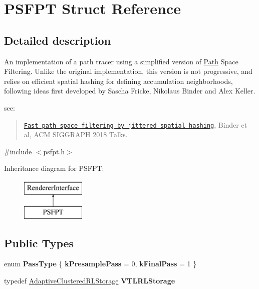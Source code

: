 \hypertarget{struct_p_s_f_p_t}{}\section{P\+S\+F\+PT Struct Reference}
\label{struct_p_s_f_p_t}


\subsection{Detailed description}
An implementation of a path tracer using a simplified version of \hyperlink{struct_path}{Path} Space Filtering. Unlike the original implementation, this version is not progressive, and relies on efficient spatial hashing for defining accumulation neighborhoods, following ideas first developed by Sascha Fricke, Nikolaus Binder and Alex Keller.

see\+: \begin{quote}
\href{https://dl.acm.org/citation.cfm?id=3214806}{\tt Fast path space filtering by jittered spatial hashing}, Binder et al, A\+CM S\+I\+G\+G\+R\+A\+PH 2018 Talks.\end{quote}


{\ttfamily \#include $<$psfpt.\+h$>$}

Inheritance diagram for P\+S\+F\+PT\+:\begin{figure}[H]
\begin{center}
\leavevmode
\includegraphics[height=2.000000cm]{struct_p_s_f_p_t}
\end{center}
\end{figure}
\subsection*{Public Types}
\begin{DoxyCompactItemize}
\item 
\mbox{\label{struct_p_s_f_p_t_af3457e65a23c54ff498f309b7e734480}} 
enum {\bfseries Pass\+Type} \{ {\bfseries k\+Presample\+Pass} = 0, 
{\bfseries k\+Final\+Pass} = 1
 \}
\item 
\mbox{\label{struct_p_s_f_p_t_aaa1050f7ed700805af1a3c95c50245d2}} 
typedef \hyperlink{struct_adaptive_clustered_r_l_storage}{Adaptive\+Clustered\+R\+L\+Storage} {\bfseries V\+T\+L\+R\+L\+Storage}
\end{DoxyCompactItemize}
